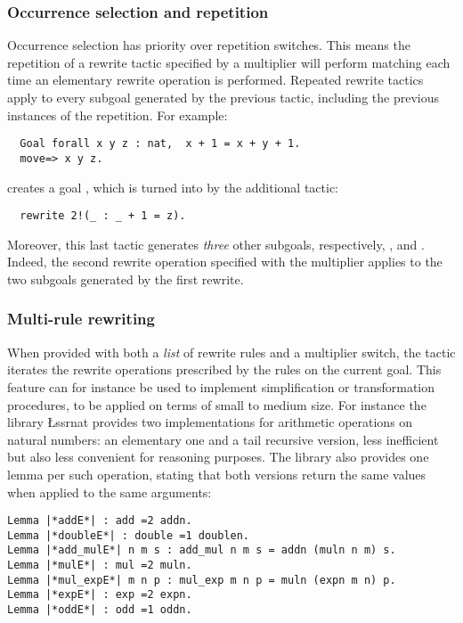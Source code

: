 \subsubsection*{Occurrence selection and repetition}
Occurrence selection has priority over repetition switches. This means
the repetition of a rewrite tactic specified by a multiplier
will perform matching each time an elementary rewrite operation is
performed. Repeated rewrite tactics apply to every subgoal generated
by the previous tactic, including the previous instances of the
repetition. For example:
\begin{lstlisting}
  Goal forall x y z : nat,  x + 1 = x + y + 1.
  move=> x y z.
\end{lstlisting}
creates a goal , which is turned into 
by the additional tactic:
\begin{lstlisting}
  rewrite 2!(_ : _ + 1 = z).
\end{lstlisting}
Moreover, this last tactic generates \emph{three} other subgoals,
respectively,
,  and . Indeed, the second
rewrite operation specified with the  multiplier applies to
the two subgoals generated by the first rewrite.

\subsubsection*{Multi-rule rewriting}
When provided with both a \emph{list} of rewrite rules and a
multiplier switch, the  tactic iterates the rewrite
operations prescribed by the rules on the current goal. This feature
can for instance be used to implement simplification or transformation
procedures, to be applied on terms of small to medium size. For
instance the library \L{ssrnat} provides two implementations for
arithmetic operations on natural numbers: an elementary one and a tail
recursive version, less inefficient but also less convenient for
reasoning purposes. The library also provides one lemma per such
operation, stating that both versions return the same values when
applied to the same arguments:

\begin{lstlisting}
Lemma |*addE*| : add =2 addn.
Lemma |*doubleE*| : double =1 doublen.
Lemma |*add_mulE*| n m s : add_mul n m s = addn (muln n m) s.
Lemma |*mulE*| : mul =2 muln.
Lemma |*mul_expE*| m n p : mul_exp m n p = muln (expn m n) p.
Lemma |*expE*| : exp =2 expn.
Lemma |*oddE*| : odd =1 oddn.
\end{lstlisting}

